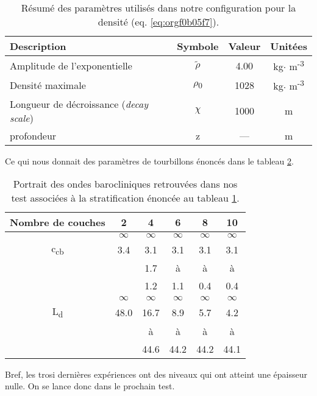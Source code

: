 \documentclass[10pt]{article}
\numberwithin{equation}{section}
\begin{document}
\begin{table}[htbp]
\caption{\label{tab:orge0c9e5f}Résumé des paramètres utilisés dans notre configuration pour la densité (eq. \ref{eq:orgf0b05f7}).}
\centering
\begin{tabular}{lccc}
\hline
\hline
Description & Symbole & Valeur & Unitées\\[0pt]
\hline
Amplitude de l'exponentielle & \(\tilde{\rho}\) & 4.00 & kg\(\cdot\) m\textsuperscript{-3}\\[0pt]
Densité maximale & \(\rho\)\textsubscript{0} & 1028 & kg\(\cdot\) m\textsuperscript{-3}\\[0pt]
Longueur de décroissance (\emph{decay scale}) & \(\chi\) & 1000 & m\\[0pt]
profondeur & z & --- & m\\[0pt]
\hline
\end{tabular}
\end{table}

Ce qui nous donnait des paramètres de tourbillons énoncés dans le tableau \ref{tab:org7ae7d27}. 

\begin{table}[htbp]
\caption{\label{tab:org7ae7d27}Portrait des ondes barocliniques retrouvées dans nos test  associées à la stratification énoncée au tableau \ref{tab:orge0c9e5f}.}
\centering
\begin{tabular}{cccccc}
\hline
\hline
Nombre de couches & 2 & 4 & 6 & 8 & 10\\[0pt]
\hline
 & \(\infty\) & \(\infty\) & \(\infty\) & \(\infty\) & \(\infty\)\\[0pt]
c\textsubscript{cb} & 3.4 & 3.1 & 3.1 & 3.1 & 3.1\\[0pt]
[m\(\cdot\) s\textsuperscript{-1}] &  & 1.7 & à & à & à\\[0pt]
 &  & 1.2 & 1.1 & 0.4 & 0.4\\[0pt]
\hline
 & \(\infty\) & \(\infty\) & \(\infty\) & \(\infty\) & \(\infty\)\\[0pt]
L\textsubscript{d} & 48.0 & 16.7 & 8.9 & 5.7 & 4.2\\[0pt]
[km] &  & à & à & à & à\\[0pt]
 &  & 44.6 & 44.2 & 44.2 & 44.1\\[0pt]
\hline
\end{tabular}
\end{table}

Bref, les trosi dernières expériences ont des niveaux qui ont atteint une épaisseur nulle.
On se lance donc dans le prochain test.
\end{document}
